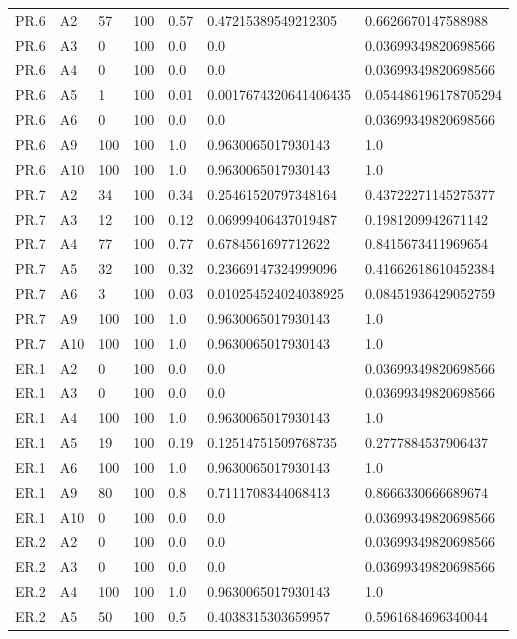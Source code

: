 \begin{tabular}{lllllll}
PR.6 & A2 & 57 & 100 & 0.57 & 0.47215389549212305 & 0.6626670147588988 \\
PR.6 & A3 & 0 & 100 & 0.0 & 0.0 & 0.03699349820698566 \\
PR.6 & A4 & 0 & 100 & 0.0 & 0.0 & 0.03699349820698566 \\
PR.6 & A5 & 1 & 100 & 0.01 & 0.0017674320641406435 & 0.054486196178705294 \\
PR.6 & A6 & 0 & 100 & 0.0 & 0.0 & 0.03699349820698566 \\
PR.6 & A9 & 100 & 100 & 1.0 & 0.9630065017930143 & 1.0 \\
PR.6 & A10 & 100 & 100 & 1.0 & 0.9630065017930143 & 1.0 \\
PR.7 & A2 & 34 & 100 & 0.34 & 0.25461520797348164 & 0.43722271145275377 \\
PR.7 & A3 & 12 & 100 & 0.12 & 0.06999406437019487 & 0.1981209942671142 \\
PR.7 & A4 & 77 & 100 & 0.77 & 0.6784561697712622 & 0.8415673411969654 \\
PR.7 & A5 & 32 & 100 & 0.32 & 0.23669147324999096 & 0.41662618610452384 \\
PR.7 & A6 & 3 & 100 & 0.03 & 0.010254524024038925 & 0.08451936429052759 \\
PR.7 & A9 & 100 & 100 & 1.0 & 0.9630065017930143 & 1.0 \\
PR.7 & A10 & 100 & 100 & 1.0 & 0.9630065017930143 & 1.0 \\
ER.1 & A2 & 0 & 100 & 0.0 & 0.0 & 0.03699349820698566 \\
ER.1 & A3 & 0 & 100 & 0.0 & 0.0 & 0.03699349820698566 \\
ER.1 & A4 & 100 & 100 & 1.0 & 0.9630065017930143 & 1.0 \\
ER.1 & A5 & 19 & 100 & 0.19 & 0.12514751509768735 & 0.2777884537906437 \\
ER.1 & A6 & 100 & 100 & 1.0 & 0.9630065017930143 & 1.0 \\
ER.1 & A9 & 80 & 100 & 0.8 & 0.7111708344068413 & 0.8666330666689674 \\
ER.1 & A10 & 0 & 100 & 0.0 & 0.0 & 0.03699349820698566 \\
ER.2 & A2 & 0 & 100 & 0.0 & 0.0 & 0.03699349820698566 \\
ER.2 & A3 & 0 & 100 & 0.0 & 0.0 & 0.03699349820698566 \\
ER.2 & A4 & 100 & 100 & 1.0 & 0.9630065017930143 & 1.0 \\
ER.2 & A5 & 50 & 100 & 0.5 & 0.4038315303659957 & 0.5961684696340044 \\

\end{tabular}
